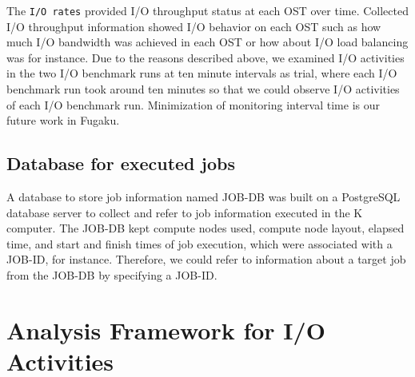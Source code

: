 \documentclass{jhps}
\begin{document}
The {\tt I/O rates} provided I/O throughput status at each OST over time.
Collected I/O throughput information showed I/O behavior on each OST
such as how much I/O bandwidth was achieved in each OST or
how about I/O load balancing was for instance.
Due to the reasons described above, we examined I/O activities
in the two I/O benchmark runs at ten minute intervals as trial,
where each I/O benchmark run took around ten minutes
so that we could observe I/O activities of each I/O benchmark run.
Minimization of monitoring interval time is our future work in Fugaku.

\subsection{Database for executed jobs}
\label{ssec:JOB_DB}

A database to store job information named JOB-DB
was built on a PostgreSQL database server to collect
and refer to job information executed in the K computer.
The JOB-DB kept compute nodes used, compute node layout, elapsed time,
and start and finish times of job execution,
which were associated with a JOB-ID, for instance.
Therefore, we could refer to information about a target job
from the JOB-DB by specifying a JOB-ID.

\section{Analysis Framework for I/O Activities}
\label{sec:ANAL_SYS}
\end{document}
